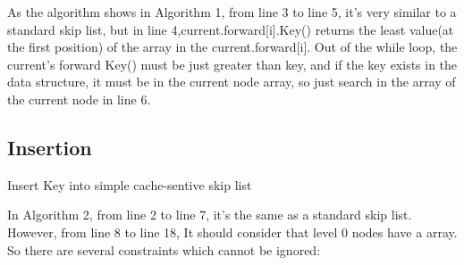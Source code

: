 \documentclass[sigconf, nonacm, letterpaper,top=2cm,bottom=2cm,left=3cm,right=3cm,marginparwidth=1.75cm]{acmart}
\begin{document}
As the algorithm shows in Algorithm 1, from line 3 to line 5, it’s very similar to a standard skip list, but in line 4,current.forward[i].Key() returns the least value(at the first position) of the array in the current.forward[i]. Out of the while loop, the current’s forward Key() must be just greater than key, and if the key exists in the data structure, it must be in the current node array, so just search in the array of the current node in line 6.


\subsection{Insertion}
\begin{algorithm}
    \caption{Insert Key into simple cache-sentive skip list}
\end{algorithm}
In Algorithm 2, from line 2 to line 7, it’s the same as a standard skip list. However, from line 8 to line 18, It should consider that level 0 nodes have a array. So there are several constraints which cannot be ignored:
\end{document}
